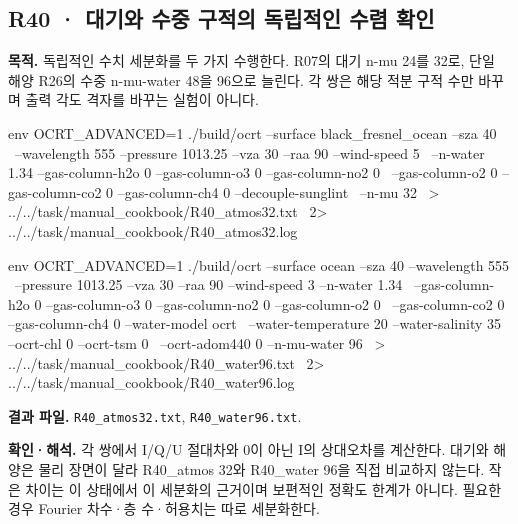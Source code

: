 
\subsection{R40 · 대기와 수중 구적의 독립적인 수렴 확인}
\label{sec:auto:09_cookbook:7.3}

\label{recipe:R40}

\textbf{목적. }독립적인 수치 세분화를 두 가지 수행한다. R07의 대기 n-mu 24를 32로, 단일 해양 R26의 수중 n-mu-water 48을 96으로 늘린다. 각 쌍은 해당 적분 구적 수만 바꾸며 출력 각도 격자를 바꾸는 실험이 아니다.

\noindent\begin{minipage}{\linewidth}
\begin{ManualCode}

env OCRT_ADVANCED=1 ./build/ocrt --surface black_fresnel_ocean --sza 40 \
  --wavelength 555 --pressure 1013.25 --vza 30 --raa 90 --wind-speed 5 \
  --n-water 1.34 --gas-column-h2o 0 --gas-column-o3 0 --gas-column-no2 0 \
  --gas-column-o2 0 --gas-column-co2 0 --gas-column-ch4 0 --decouple-sunglint \
  --n-mu 32 \
  > ../../task/manual_cookbook/R40_atmos32.txt \
  2> ../../task/manual_cookbook/R40_atmos32.log

\end{ManualCode}
\end{minipage}\par

\noindent\begin{minipage}{\linewidth}
\begin{ManualCode}

env OCRT_ADVANCED=1 ./build/ocrt --surface ocean --sza 40 --wavelength 555 \
  --pressure 1013.25 --vza 30 --raa 90 --wind-speed 3 --n-water 1.34 \
  --gas-column-h2o 0 --gas-column-o3 0 --gas-column-no2 0 --gas-column-o2 0 \
  --gas-column-co2 0 --gas-column-ch4 0 --water-model ocrt \
  --water-temperature 20 --water-salinity 35 --ocrt-chl 0 --ocrt-tsm 0 \
  --ocrt-adom440 0 --n-mu-water 96 \
  > ../../task/manual_cookbook/R40_water96.txt \
  2> ../../task/manual_cookbook/R40_water96.log

\end{ManualCode}
\end{minipage}\par

\textbf{결과 파일. }\texttt{R40\_\allowbreak{}atmos32.txt}, \texttt{R40\_\allowbreak{}water96.txt}.

\textbf{확인·해석. }각 쌍에서 I/Q/U 절대차와 0이 아닌 I의 상대오차를 계산한다. 대기와 해양은 물리 장면이 달라 R40\_atmos 32와 R40\_water 96을 직접 비교하지 않는다. 작은 차이는 이 상태에서 이 세분화의 근거이며 보편적인 정확도 한계가 아니다. 필요한 경우 Fourier 차수·층 수·허용치는 따로 세분화한다.

